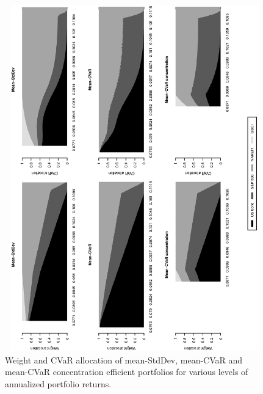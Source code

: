 \documentclass[12pt,a4paper]{article}
\begin{document}
\begin{figure}[tb]
\caption{Weight and CVaR allocation of mean-StdDev, mean-CVaR and mean-CVaR concentration efficient
portfolios for various levels of annualized portfolio returns. \label{fig:EfficientFrontier_weights}   }
\includegraphics[width=12cm,height=15cm,angle=270]{stackedweightsriskcont_efficientfrontier_clean.eps}
\end{figure}
\end{document}

